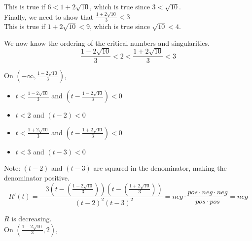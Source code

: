 \documentclass{ximera}
\begin{document}
\begin{example}
\begin{explanation}
This is true if $6 < 1 + 2 \sqrt{10}$, which is true since $3 < \sqrt{10}$. \\



Finally, we need to show that $\frac{1 + 2 \sqrt{10}}{3} < 3$ \\


This is true if $1 + 2 \sqrt{10} < 9$, which is true since $\sqrt{10} < 4$.





\end{explanation}




We now know the ordering of the critical numbers and singularities. \\


\[
\frac{1 - 2 \sqrt{10}}{3} < 2 < \frac{1 + 2 \sqrt{10}}{3} < 3
\]





On $\left( -\infty, \frac{1 - 2 \sqrt{10}}{3} \right)$, 



\begin{itemize}
\item $t < \frac{1 - 2 \sqrt{10}}{3}$ and $\left( t - \frac{1 - 2 \sqrt{10}}{3} \right) < 0$
\item $t < 2$ and $(t - 2) < 0$
\item $t < \frac{1 + 2 \sqrt{10}}{3}$ and $\left( t - \frac{1 + 2 \sqrt{10}}{3} \right) < 0$
\item $t < 3$ and $(t - 3) < 0$
\end{itemize}

Note: $(t-2)$ and $(t-3)$ are squared in the denominator, making the denominator positive. \\

\[   
R'(t) = -\frac{3 \left(t - \left(\frac{1 - 2 \sqrt{10}}{3} \right) \right) \left(t - \left(\frac{1 + 2 \sqrt{10}}{3} \right) \right) }{ (t-2)^2 (t-3)^2 }  = neg \cdot \frac{pos \cdot neg \cdot neg}{pos \cdot pos} = neg
\]


$R$ is decreasing. \\













On $\left( \frac{1 - 2 \sqrt{10}}{3}, 2 \right)$, 



\end{example}
\end{document}
